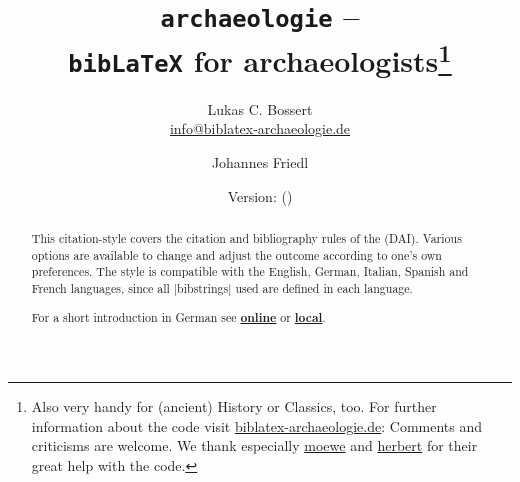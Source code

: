\documentclass[a4paper,
10pt,
greek,
french,
spanish,
italian,
ngerman,
english
]{ltxdoc}
\begin{document}
\title{\texttt{archaeologie} -- \\\texttt{bib\LaTeX} for archaeologists\footnote{Also very handy for (ancient) History or Classics, too.
For further information about the code visit \href{http://www.biblatex-archaeologie.de}{biblatex-archaeologie.de}: 
Comments and criticisms are welcome.
We thank especially \href{https://tex.stackexchange.com/users/35864/moewe}{moewe} and \href{https://tex.stackexchange.com/users/2478/herbert}{herbert} for their great help with the code.%
}}
\author{Lukas C. Bossert\\{\small \href{mailto:info@biblatex-archaeologie.de}{info@biblatex-archaeologie.de}} 
\and Johannes Friedl}
\date{Version: \archaeologieversion{} (\archaeologiedate)} 
\maketitle

\begin{abstract}
\noindent This citation-style covers the citation and bibliography rules of the \DAI (DAI). 
Various options are available to change and adjust the outcome according to one's own preferences. 
The style is compatible with the English, German, Italian, Spanish and French languages, since all |bibstrings| used are defined in each language.
\bigskip

\noindent For a short introduction in German see   \href{pdfdeu.biblatex-archaeologie.de}{\textbf{online}} or   \href{file:archaeologie-ger.pdf}{\textbf{local}}.
\end{abstract}


\begin{multicols}{2}
\footnotesize\parskip=0mm \tableofcontents
\end{multicols}
\end{document}
